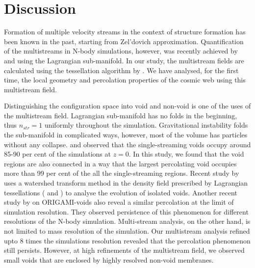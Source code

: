 \documentclass[fleqn,usenatbib,useAMS]{mnras}
\begin{document}

\section{Discussion}
\label{sec:discussion}


Formation of multiple velocity streams in the context of structure formation has been known in the past, starting from Zel'dovich approximation. Quantification of the multistreams in N-body simulations, however, was recently achieved by \cite{Shandarin2012} and \cite{Abel2012b} using the Lagrangian sub-manifold. In our study, the multistream fields are calculated using the tessellation algorithm by \cite{Shandarin2012}. We have analysed, for the first time, the local geometry and percolation properties of the cosmic web using this multistream field.   

Distinguishing the configuration space into void and non-void is one of the uses of the multistream field. Lagrangian sub-manifold has no folds in the beginning, thus $n_{str} = 1$ uniformly throughout the simulation. Gravitational instability folds the sub-manifold in complicated ways, however, most of the volume has particles without any collapse. \cite{Shandarin2012} and \cite{Ramachandra2015} observed that the single-streaming voids occupy around 85-90 per cent of the simulations at $z=0$. In this study, we found that the void regions are also connected in a way that the largest percolating void occupies more than 99 per cent of the all the single-streaming regions. Recent study by \cite{Wojtak2016a} uses a watershed transform method in the density field prescribed by Lagrangian tessellations (\citealt{Shandarin2012} and \citealt{Abel2012b}) to analyse the evolution of isolated voids. Another recent study by \cite{Falck2015} on ORIGAMI-voids also reveal a similar percolation at the limit of simulation resolution. They observed persistence of this phenomenon for different resolutions of the N-body simulation. Multi-stream analysis, on the other hand, is not limited to mass resolution of the simulation. Our multistream analysis refined upto 8 times the simulations resolution revealed that the percolation phenomenon still persists. However, at high refinements of the multistream field, we observed small voids that are enclosed by highly resolved non-void membranes. 
\end{document}
